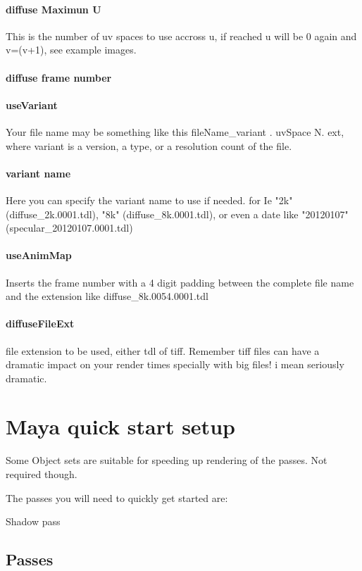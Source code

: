 \documentclass[final,letterpaper,twoside,12pt]{report}
\begin{document}
\subsubsection {diffuse Maximun U}
This is the number of uv spaces to use accross u, if reached u will be 0 again and v=(v+1), see example images.
\smallskip
\subsubsection {diffuse frame number}

\smallskip
\subsubsection {useVariant}
Your file name may be something like this fileName\_variant . uvSpace N. ext, where variant is a version, a type, or a resolution count of the file.
\smallskip
\subsubsection {variant name}
Here you can specify the variant name to use if needed. for Ie "2k" (diffuse\_2k.0001.tdl), "8k" (diffuse\_8k.0001.tdl), or even a date like "20120107" (specular\_20120107.0001.tdl)
\smallskip
\subsubsection {useAnimMap}
Inserts the frame number with a 4 digit padding between the complete file name and the extension like diffuse\_8k.0054.0001.tdl
\subsubsection {diffuseFileExt}
file extension to be used, either tdl of tiff.
Remember tiff files can have a dramatic impact on your render times specially with big files! i mean seriously dramatic.
\smallskip

\chapter{Maya quick start setup}
Some Object sets are suitable for speeding up rendering of the passes. Not required though.

The passes you will need to quickly get started are:

Shadow pass

\section {Passes}
\end{document}
